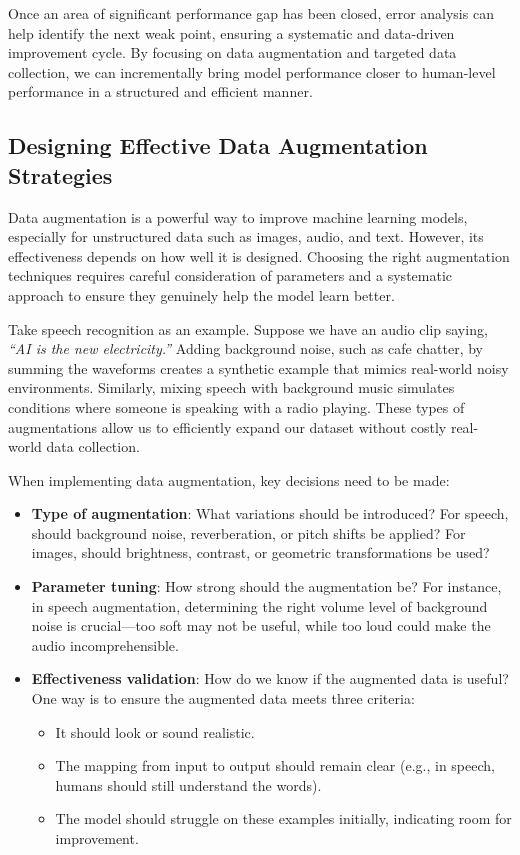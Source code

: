 \documentclass[12pt,openany]{book}
\begin{document}
Once an area of significant performance gap has been closed, error analysis can help identify the next weak point, ensuring a systematic and data-driven improvement cycle. By focusing on data augmentation and targeted data collection, we can incrementally bring model performance closer to human-level performance in a structured and efficient manner.


\subsection{Designing Effective Data Augmentation Strategies}

Data augmentation is a powerful way to improve machine learning models, especially for unstructured data such as images, audio, and text. However, its effectiveness depends on how well it is designed. Choosing the right augmentation techniques requires careful consideration of parameters and a systematic approach to ensure they genuinely help the model learn better. \newline

Take speech recognition as an example. Suppose we have an audio clip saying, \textit{``AI is the new electricity.''} Adding background noise, such as cafe chatter, by summing the waveforms creates a synthetic example that mimics real-world noisy environments. Similarly, mixing speech with background music simulates conditions where someone is speaking with a radio playing. These types of augmentations allow us to efficiently expand our dataset without costly real-world data collection.

When implementing data augmentation, key decisions need to be made:
\begin{itemize}
    \item \textbf{Type of augmentation}: What variations should be introduced? For speech, should background noise, reverberation, or pitch shifts be applied? For images, should brightness, contrast, or geometric transformations be used?
    \item \textbf{Parameter tuning}: How strong should the augmentation be? For instance, in speech augmentation, determining the right volume level of background noise is crucial—too soft may not be useful, while too loud could make the audio incomprehensible.
    \item \textbf{Effectiveness validation}: How do we know if the augmented data is useful? One way is to ensure the augmented data meets three criteria:
        \begin{itemize}
            \item It should look or sound realistic.
            \item The mapping from input to output should remain clear (e.g., in speech, humans should still understand the words).
            \item The model should struggle on these examples initially, indicating room for improvement.
        \end{itemize}
\end{itemize}
\end{document}
